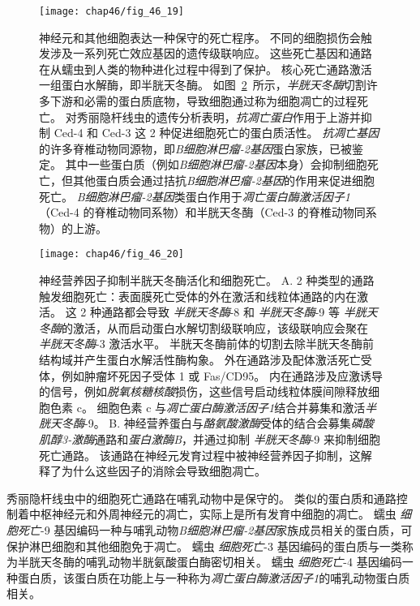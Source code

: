 \begin{figure}[htbp]
	\centering
	\texttt{[image: chap46/fig\_46\_19]}
	\caption{神经元和其他细胞表达一种保守的死亡程序。
	不同的细胞损伤会触发涉及一系列死亡效应基因的遗传级联响应。
	这些死亡基因和通路在从蠕虫到人类的物种进化过程中得到了保护。
	核心死亡通路激活一组蛋白水解酶，即半胱天冬酶。
	如图~\ref{fig:46_20}~所示，\textit{半胱天冬酶}切割许多下游和必需的蛋白质底物，导致细胞通过称为细胞凋亡的过程死亡。
	对秀丽隐杆线虫的遗传分析表明，\textit{抗凋亡蛋白}作用于上游并抑制 Ced-4 和 Ced-3 这 2 种促进细胞死亡的蛋白质活性。
	\textit{抗凋亡基因}的许多脊椎动物同源物，即\textit{B细胞淋巴瘤-2基因}蛋白家族，已被鉴定。
	其中一些蛋白质（例如\textit{B细胞淋巴瘤-2基因}本身）会抑制细胞死亡，但其他蛋白质会通过拮抗\textit{B细胞淋巴瘤-2基因}的作用来促进细胞死亡。
	\textit{B细胞淋巴瘤-2基因}类蛋白作用于\textit{凋亡蛋白酶激活因子1}（Ced-4 的脊椎动物同系物）和半胱天冬酶（Ced-3 的脊椎动物同系物）的上游。}
	\label{fig:46_19}
\end{figure}


\begin{figure}[htbp]
	\centering
	\texttt{[image: chap46/fig\_46\_20]}
	\caption{神经营养因子抑制半胱天冬酶活化和细胞死亡\cite{jesenberger2002deadly}。
		A. 2 种类型的通路触发细胞死亡：表面膜死亡受体的外在激活和线粒体通路的内在激活。
		这 2 种通路都会导致 \textit{半胱天冬酶}-8 和 \textit{半胱天冬酶}-9 等 \textit{半胱天冬酶}的激活，从而启动蛋白水解切割级联响应，该级联响应会聚在 \textit{半胱天冬酶}-3 激活水平。
		半胱天冬酶前体的切割去除半胱天冬酶前结构域并产生蛋白水解活性酶构象。
		外在通路涉及配体激活死亡受体，例如肿瘤坏死因子受体 1 或 Fas/CD95。
		内在通路涉及应激诱导的信号，例如\textit{脱氧核糖核酸}损伤，这些信号启动线粒体膜间隙释放细胞色素 c。
		细胞色素 c 与\textit{凋亡蛋白酶激活因子1}结合并募集和激活\textit{半胱天冬酶}-9。
		B. 神经营养蛋白与\textit{酪氨酸激酶}受体的结合会募集\textit{磷酸肌醇3-激酶}通路和\textit{蛋白激酶B}，并通过抑制 \textit{半胱天冬酶}-9 来抑制细胞死亡通路。
		该通路在神经元发育过程中被神经营养因子抑制，这解释了为什么这些因子的消除会导致细胞凋亡。}
	\label{fig:46_20}
\end{figure}


秀丽隐杆线虫中的细胞死亡通路在哺乳动物中是保守的。
类似的蛋白质和通路控制着中枢神经元和外周神经元的凋亡，实际上是所有发育中细胞的凋亡。
蠕虫 \textit{细胞死亡}-9 基因编码一种与哺乳动物\textit{B细胞淋巴瘤-2基因}家族成员相关的蛋白质，可保护淋巴细胞和其他细胞免于凋亡。
蠕虫 \textit{细胞死亡}-3 基因编码的蛋白质与一类称为半胱天冬酶的哺乳动物半胱氨酸蛋白酶密切相关。
蠕虫 \textit{细胞死亡}-4 基因编码一种蛋白质，该蛋白质在功能上与一种称为\textit{凋亡蛋白酶激活因子1}的哺乳动物蛋白质相关。


